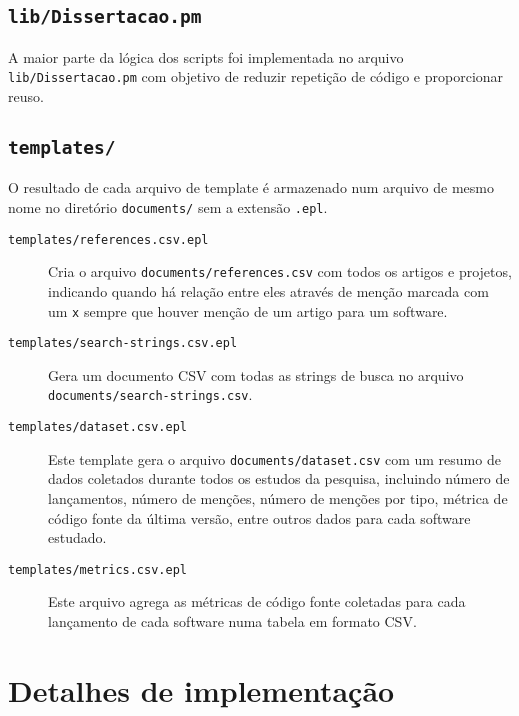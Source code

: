 \subsection{\texttt{lib/Dissertacao.pm}}

A maior parte da lógica dos scripts foi implementada no arquivo
\texttt{lib/Dissertacao.pm} com objetivo de reduzir repetição de código e
proporcionar reuso.

\subsection{\texttt{templates/}}

O resultado de cada arquivo de template é armazenado num arquivo de mesmo nome
no diretório \texttt{documents/} sem a extensão \texttt{.epl}.

\begin{description}

  \item [\texttt{templates/references.csv.epl}]
    Cria o arquivo \texttt{documents/references.csv} com todos os artigos e
    projetos, indicando quando há relação entre eles através de menção marcada
    com um \texttt{x} sempre que houver menção de um artigo para um software.

  \item [\texttt{templates/search-strings.csv.epl}]
    Gera um documento CSV com todas as strings de busca no arquivo
    \texttt{documents/search-strings.csv}.

  \item [\texttt{templates/dataset.csv.epl}]
    Este template gera o arquivo \texttt{documents/dataset.csv} com um resumo de
    dados coletados durante todos os estudos da pesquisa, incluindo número de lançamentos,
    número de menções, número de menções por tipo, métrica de código fonte da última
    versão, entre outros dados para cada software estudado.

  \item [\texttt{templates/metrics.csv.epl}]
    Este arquivo agrega as métricas de código fonte coletadas para cada lançamento
    de cada software numa tabela em formato CSV.


\end{description}

\section{Detalhes de implementação}

